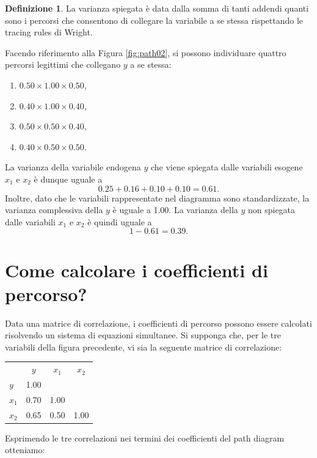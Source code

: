 \documentclass[
  11pt,
]{krantz}
\providecommand{\tightlist}{%
  \setlength{\itemsep}{0pt}\setlength{\parskip}{0pt}}
\theoremstyle{definition}
\newtheorem{definition}{Definizione}[chapter]
\theoremstyle{definition}
\theoremstyle{definition}
\theoremstyle{definition}
\theoremstyle{remark}
\begin{document}
\begin{definition}
La varianza spiegata è data dalla somma di tanti addendi quanti sono i percorsi che consentono di collegare la variabile a se stessa rispettando le tracing rules di Wright.
\end{definition}

Facendo riferimento alla Figura \ref{fig:path02}, si possono individuare quattro percorsi legittimi che collegano \(y\) a se stessa:

\begin{enumerate}
\def\labelenumi{\arabic{enumi}.}
\tightlist
\item
  \(0.50 \times 1.00 \times 0.50\),
\item
  \(0.40 \times 1.00 \times 0.40\),
\item
  \(0.50 \times 0.50 \times 0.40\),
\item
  \(0.40 \times 0.50 \times 0.50\).
\end{enumerate}

La varianza della variabile endogena \(y\) che viene spiegata dalle variabili esogene \(x_1\) e \(x_2\) è dunque uguale a \[0.25 + 0.16  + 0.10 + 0.10= 0.61.\] Inoltre, dato che le variabili rappresentate nel diagramma sono standardizzate, la varianza complessiva della \(y\) è uguale a 1.00. La varianza della \(y\) non spiegata dalle variabili \(x_1\) e \(x_2\) è quindi uguale a \[1-0.61 = 0.39.\]

\hypertarget{sec:how_compute_path_coef}{%
\section{Come calcolare i coefficienti di percorso?}\label{sec:how_compute_path_coef}}

Data una matrice di correlazione, i coefficienti di percorso possono essere calcolati risolvendo un sistema di equazioni simultanee. Si supponga che, per le tre variabili della figura precedente, vi sia la seguente matrice di correlazione:

\begin{longtable}[]{@{}lccc@{}}
\toprule
\endhead
& \(y\) & \(x_1\) & \(x_2\) \\
\(y\) & 1.00 & & \\
\(x_1\) & 0.70 & 1.00 & \\
\(x_2\) & 0.65 & 0.50 & 1.00 \\
\bottomrule
\end{longtable}

Esprimendo le tre correlazioni nei termini dei coefficienti del path diagram otteniamo:
\end{document}
